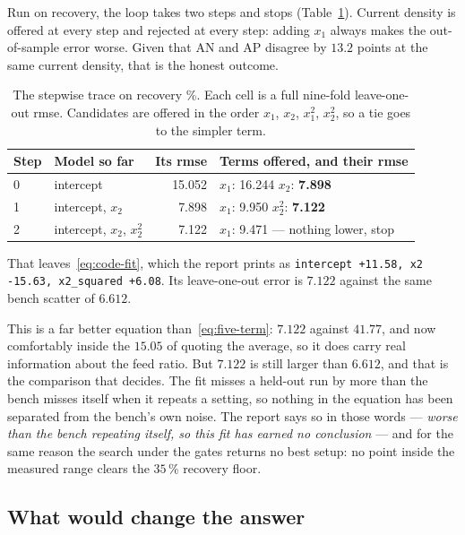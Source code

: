 Run on recovery, the loop takes two steps and stops (Table~\ref{tab:stepwise-trace}). Current
density is offered at every step and rejected at every step: adding $x_1$ always makes the
out-of-sample error worse. Given that AN and AP disagree by $13.2$ points at the same current
density, that is the honest outcome.

\begin{table}[htbp]
  \centering
  \caption{The stepwise trace on recovery \%. Each cell is a full nine-fold leave-one-out rmse.
  Candidates are offered in the order $x_1$, $x_2$, $x_1^2$, $x_2^2$, so a tie goes to the
  simpler term.}
  \label{tab:stepwise-trace}
  \begin{tabular}{@{}llrl@{}}
    \toprule
    Step & Model so far & Its rmse & Terms offered, and their rmse \\
    \midrule
    0 & intercept                     & 15.052 & $x_1$: 16.244 \quad $x_2$: \textbf{7.898} \\
    1 & intercept, $x_2$              &  7.898 & $x_1$: 9.950 \quad $x_2^2$: \textbf{7.122} \\
    2 & intercept, $x_2$, $x_2^{2}$   &  7.122 & $x_1$: 9.471 --- nothing lower, stop \\
    \bottomrule
  \end{tabular}
\end{table}

That leaves~\eqref{eq:code-fit}, which the report prints as
\texttt{intercept +11.58,\allowbreak{} x2 -15.63,\allowbreak{} x2\_squared +6.08}. Its leave-one-out error is $7.122$
against the same bench scatter of $6.612$.

This is a far better equation than~\eqref{eq:five-term}: $7.122$ against $41.77$, and now
comfortably inside the $15.05$ of quoting the average, so it does carry real information about
the feed ratio. But $7.122$ is still larger than $6.612$, and that is the comparison that
decides. The fit misses a held-out run by more than the bench misses itself when it repeats a
setting, so nothing in the equation has been separated from the bench's own noise. The report
says so in those words --- \emph{worse than the bench repeating itself, so this fit has earned
no conclusion} --- and for the same reason the search under the gates returns no best setup: no
point inside the measured range clears the $35\,\%$ recovery floor.

\subsection{What would change the answer}

